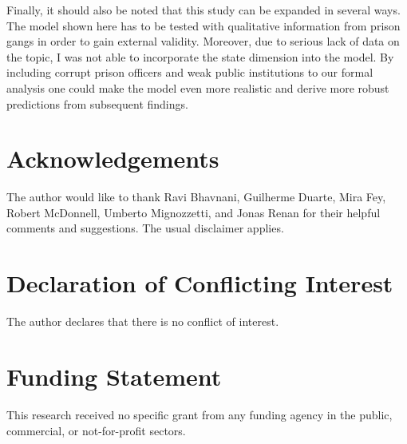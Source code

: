 \documentclass[a4paper,12pt]{article}
\begin{document}
Finally, it should also be noted that this study can be expanded in several ways. The model shown here  has to be tested with qualitative information from prison gangs in order to gain external validity. Moreover, due to serious lack of data on the topic, I was not able to incorporate the state dimension into the model. By including corrupt prison officers and weak public institutions to our formal analysis one could make the model even more realistic and derive more robust predictions from subsequent findings. 

\section*{Acknowledgements}
The author would like to thank Ravi Bhavnani, Guilherme Duarte, Mira Fey, Robert McDonnell, Umberto Mignozzetti, and Jonas Renan for their helpful comments and suggestions. The usual disclaimer applies.

\section*{Declaration of Conflicting Interest}
The author declares that there is no conflict of interest.

\section*{Funding Statement}
This research received no specific grant from any funding agency in the public, commercial, or not-for-profit sectors.

\theendnotes



\end{document}
